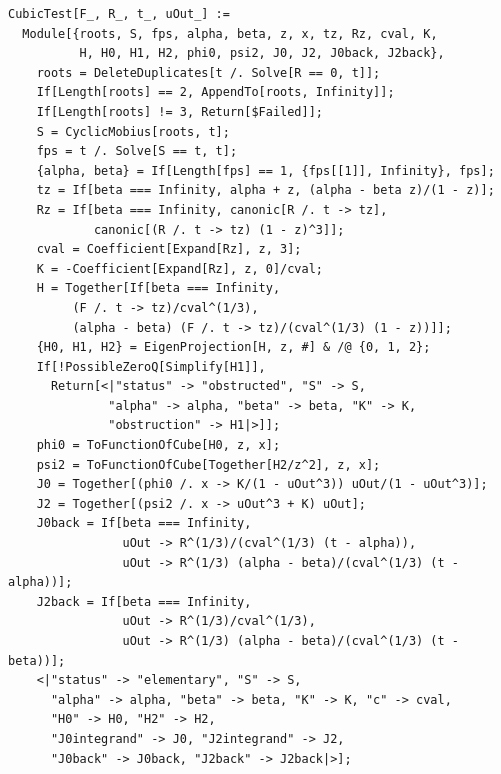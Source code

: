 \documentclass[11pt,a4paper]{article}
\theoremstyle{plain}
\theoremstyle{definition}
\theoremstyle{remark}
\begin{document}
\begin{lstlisting}
CubicTest[F_, R_, t_, uOut_] :=
  Module[{roots, S, fps, alpha, beta, z, x, tz, Rz, cval, K,
          H, H0, H1, H2, phi0, psi2, J0, J2, J0back, J2back},
    roots = DeleteDuplicates[t /. Solve[R == 0, t]];
    If[Length[roots] == 2, AppendTo[roots, Infinity]];
    If[Length[roots] != 3, Return[$Failed]];
    S = CyclicMobius[roots, t];
    fps = t /. Solve[S == t, t];
    {alpha, beta} = If[Length[fps] == 1, {fps[[1]], Infinity}, fps];
    tz = If[beta === Infinity, alpha + z, (alpha - beta z)/(1 - z)];
    Rz = If[beta === Infinity, canonic[R /. t -> tz],
            canonic[(R /. t -> tz) (1 - z)^3]];
    cval = Coefficient[Expand[Rz], z, 3];
    K = -Coefficient[Expand[Rz], z, 0]/cval;
    H = Together[If[beta === Infinity,
         (F /. t -> tz)/cval^(1/3),
         (alpha - beta) (F /. t -> tz)/(cval^(1/3) (1 - z))]];
    {H0, H1, H2} = EigenProjection[H, z, #] & /@ {0, 1, 2};
    If[!PossibleZeroQ[Simplify[H1]],
      Return[<|"status" -> "obstructed", "S" -> S,
              "alpha" -> alpha, "beta" -> beta, "K" -> K,
              "obstruction" -> H1|>]];
    phi0 = ToFunctionOfCube[H0, z, x];
    psi2 = ToFunctionOfCube[Together[H2/z^2], z, x];
    J0 = Together[(phi0 /. x -> K/(1 - uOut^3)) uOut/(1 - uOut^3)];
    J2 = Together[(psi2 /. x -> uOut^3 + K) uOut];
    J0back = If[beta === Infinity,
                uOut -> R^(1/3)/(cval^(1/3) (t - alpha)),
                uOut -> R^(1/3) (alpha - beta)/(cval^(1/3) (t - alpha))];
    J2back = If[beta === Infinity,
                uOut -> R^(1/3)/cval^(1/3),
                uOut -> R^(1/3) (alpha - beta)/(cval^(1/3) (t - beta))];
    <|"status" -> "elementary", "S" -> S,
      "alpha" -> alpha, "beta" -> beta, "K" -> K, "c" -> cval,
      "H0" -> H0, "H2" -> H2,
      "J0integrand" -> J0, "J2integrand" -> J2,
      "J0back" -> J0back, "J2back" -> J2back|>];


\end{lstlisting}
\end{document}
